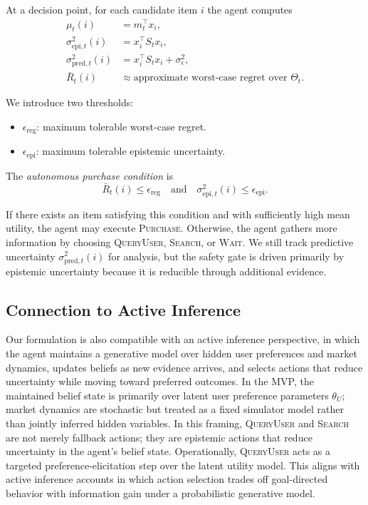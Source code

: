 \documentclass[11pt]{article}
\begin{document}
At a decision point, for each candidate item $i$ the agent computes
\begin{align}
\mu_t(i) &= m_t^\top x_i,\\
\sigma_{\text{epi},t}^2(i) &= x_i^\top S_t x_i,\\
\sigma_{\text{pred},t}^2(i) &= x_i^\top S_t x_i + \sigma_\epsilon^2,\\
\bar{R}_t(i) &\approx \text{approximate worst-case regret over } \Theta_t.
\end{align}

We introduce two thresholds:
\begin{itemize}
    \item $\epsilon_{\text{reg}}$: maximum tolerable worst-case regret.
    \item $\epsilon_{\text{epi}}$: maximum tolerable epistemic uncertainty.
\end{itemize}

The \emph{autonomous purchase condition} is
\begin{equation}
\bar{R}_t(i) \leq \epsilon_{\text{reg}} \quad \text{and} \quad \sigma_{\text{epi},t}^2(i) \leq \epsilon_{\text{epi}}.
\end{equation}

If there exists an item satisfying this condition and with sufficiently high mean utility, the agent may execute \textsc{Purchase}. Otherwise, the agent gathers more information by choosing \textsc{QueryUser}, \textsc{Search}, or \textsc{Wait}. We still track predictive uncertainty $\sigma_{\text{pred},t}^2(i)$ for analysis, but the safety gate is driven primarily by epistemic uncertainty because it is reducible through additional evidence.

\subsection{Connection to Active Inference}

Our formulation is also compatible with an active inference perspective, in which the agent maintains a generative model over hidden user preferences and market dynamics, updates beliefs as new evidence arrives, and selects actions that reduce uncertainty while moving toward preferred outcomes.\cite{bogacz2017tutorial,smith2022active} In the MVP, the maintained belief state is primarily over latent user preference parameters $\theta_U$; market dynamics are stochastic but treated as a fixed simulator model rather than jointly inferred hidden variables. In this framing, \textsc{QueryUser} and \textsc{Search} are not merely fallback actions; they are epistemic actions that reduce uncertainty in the agent's belief state. Operationally, \textsc{QueryUser} acts as a targeted preference-elicitation step over the latent utility model. This aligns with active inference accounts in which action selection trades off goal-directed behavior with information gain under a probabilistic generative model.\cite{smith2022active}
\end{document}
